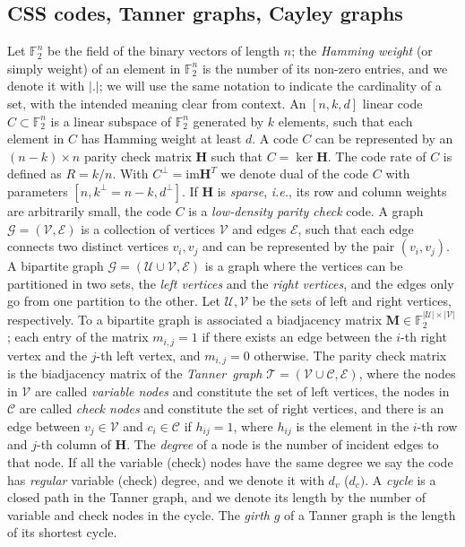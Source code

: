 \documentclass[a4paper,twocolumn,11pt,accepted=2026-05-03]{quantumarticle}
\newcommand{\setu}{\mathcal{U}}
\newcommand{\setv}{\mathcal{V}}
\newcommand{\setc}{\mathcal{C}}
\newcommand{\sete}{\mathcal{E}}
\newcommand{\setg}{\mathcal{G}}
\begin{document}
\subsection{CSS codes, Tanner graphs, Cayley graphs}
Let $\mathbb{F}_2^{n}$ be the field of the binary vectors of length $n$; the \textit{Hamming weight} (or simply weight) of an element in $\mathbb{F}_2^{n}$ is the number of its non-zero entries, and we denote it with $|.|$; we will use the same notation to indicate the cardinality of a set, with the intended meaning clear from context. An $[n,k,d]$ linear code $C \subset \mathbb{F}_2^{n}$ is a linear subspace of $\mathbb{F}_2^{n}$ generated by $k$ elements, such that each element in $C$ has Hamming weight at least $d$. A code $C$ can be represented by an $(n-k) \times n$ parity check matrix $\mathbf{H}$ such that $C = \ker \mathbf{H}$. The code rate of $C$ is defined as $R=k/n$. With $C^{\perp} = \mathrm{im}\mathbf{H}^T$ we denote dual of the code $C$ with parameters $[n,k^{\perp}=n-k,d^{\perp}]$. If $\mathbf{H}$ is \textit{sparse}, \textit{i.e.}, its row and column weights are arbitrarily small, the code $C$ is a \textit{low-density parity check} code. A graph $\setg = (\setv,\sete)$ is a collection of vertices $\setv$ and edges $\sete$, such that each edge connects two distinct vertices $v_i,v_j$ and can be represented by the pair $(v_i,v_j)$. A bipartite graph $\setg = (\setu \cup \setv, \sete)$ is a graph where the vertices can be partitioned in two sets, the \textit{left vertices} and the \textit{right vertices}, and the edges only go from one partition to the other. Let $\setu,\setv$ be the sets of left and right vertices, respectively. To a bipartite graph is associated a biadjacency matrix $\mathbf{M} \in \mathbb{F}_2^{|\setu|\times |\setv|}$; each entry of the matrix $m_{i,j}=1$ if there exists an edge between the $i$-th right vertex and the $j$-th left vertex, and $m_{i,j}=0$ otherwise.  The parity check matrix is the biadjacency matrix of the \textit{Tanner~graph} $\mathcal{T}=(\setv\cup \setc,\sete)$, where the nodes in $\setv$ are called \textit{variable nodes} and constitute the set of left vertices, the nodes in $\setc$ are called \textit{check nodes} and constitute the set of right vertices, and there is an edge between $v_j \in \setv$ and $c_i \in \setc$ if $h_{ij}=1$, where $h_{ij}$ is the element in the $i$-th row and $j$-th column of $\mathbf{H}$. The \textit{degree} of a node is the number of incident edges to that node. If all the variable (check) nodes have the same degree we say the code has \textit{regular} variable (check) degree, and we denote it with $d_v$ ($d_c)$. A \textit{cycle} is a closed path in the Tanner graph, and we denote its length by the number of variable and check nodes in the cycle. The \textit{girth} $g$ of a Tanner graph is the length of its shortest cycle. 
\end{document}
